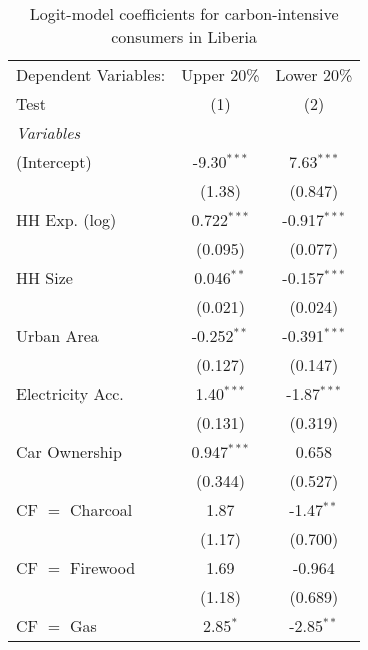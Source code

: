 
\begin{table}[htbp!]
   \centering
   \small
   \begin{adjustbox}{width = 1\textwidth, max height = 0.95\textheight, center}
      \begin{threeparttable}[b]
         \caption{\label{tab:Logit_1_LBR} Logit-model coefficients for carbon-intensive consumers in Liberia}
         \begin{tabular}{lcc}
            \tabularnewline \midrule \midrule
            Dependent Variables: & Upper 20\%     & Lower 20\%\\   
            Test                 & (1)            & (2)\\  
            \midrule
            \emph{Variables}\\
            (Intercept)          & -9.30$^{***}$  & 7.63$^{***}$\\   
                                 & (1.38)         & (0.847)\\   
            HH Exp. (log)        & 0.722$^{***}$  & -0.917$^{***}$\\   
                                 & (0.095)        & (0.077)\\   
            HH Size              & 0.046$^{**}$   & -0.157$^{***}$\\   
                                 & (0.021)        & (0.024)\\   
            Urban Area           & -0.252$^{**}$  & -0.391$^{***}$\\   
                                 & (0.127)        & (0.147)\\   
            Electricity Acc.     & 1.40$^{***}$   & -1.87$^{***}$\\   
                                 & (0.131)        & (0.319)\\   
            Car Ownership        & 0.947$^{***}$  & 0.658\\   
                                 & (0.344)        & (0.527)\\   
            CF $=$ Charcoal      & 1.87           & -1.47$^{**}$\\   
                                 & (1.17)         & (0.700)\\   
            CF $=$ Firewood      & 1.69           & -0.964\\   
                                 & (1.18)         & (0.689)\\   
            CF $=$ Gas           & 2.85$^{*}$     & -2.85$^{**}$\\   

\end{tabular}
\end{threeparttable}
\end{adjustbox}
\end{table}
